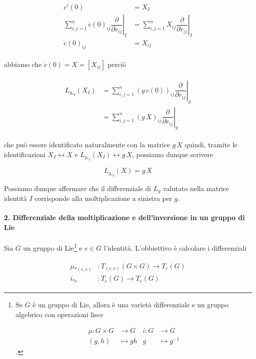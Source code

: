 \begin{align}
	\begin{split}
		c'(0) &= X_{I}\\
		\sum_{i,j=1}^{n} \dot{c}(0)_{ij} \left. \dfrac{\partial}{\partial r_{ij}} \right|_{I} &= \sum_{i,j=1}^{n} X_{ij} \left. \dfrac{\partial}{\partial r_{ij}} \right|_{I}\\
		\dot{c}(0)_{ij} &= X_{ij}
	\end{split}
\end{align}

abbiamo che $ \dot{c}(0) = X = [X_{ij}] $ perciò

\begin{align}
	\begin{split}
		L_{g_{*I}}(X_{I}) &= \sum_{i,j=1}^{n} (g \, \dot{c}(0))_{ij} \left. \dfrac{\partial}{\partial r_{ij}} \right|_{g}\\
		&= \sum_{i,j=1}^{n} (g \, X)_{ij} \left. \dfrac{\partial}{\partial r_{ij}} \right|_{g}
	\end{split}
\end{align}

che può essere identificato naturalmente con la matrice $ g \, X $ quindi, tramite le identificazioni $ X_{I} \leftrightarrow X $ e $ L_{g_{*I}}(X_{I}) \leftrightarrow g \, X $, possiamo dunque scrivere

\begin{equation}
	L_{g_{*I}}(X) = g \, X
\end{equation}

Possiamo dunque affermare che il differenziale di $ L_{g} $ valutato nella matrice identità $ I $ corrisponde alla moltiplicazione a sinistra per $ g $.

\paragraph{2. Differenziale della moltiplicazione e dell'inversione in un gruppo di Lie}

Sia $ G $ un gruppo di Lie\footnote{%
	Se $ G $ è un gruppo di Lie, allora è una varietà differenziale e un gruppo algebrico con operazioni lisce
	
	\begin{align}
		\mu : G \times G &\to G & i : G &\to G\nonumber\\
		(g,h) &\mapsto g h & g &\mapsto g^{-1}
	\end{align}.%
} e $ e \in G $ l'identità. L'obbiettivo è calcolare i differenziali

\begin{align}
	\begin{split}
		\mu_{*(e,e)} &: T_{(e,e)}(G \times G) \to T_{e}(G)\\
		i_{*e} &: T_{e}(G) \to T_{e}(G)
	\end{split}
\end{align}

